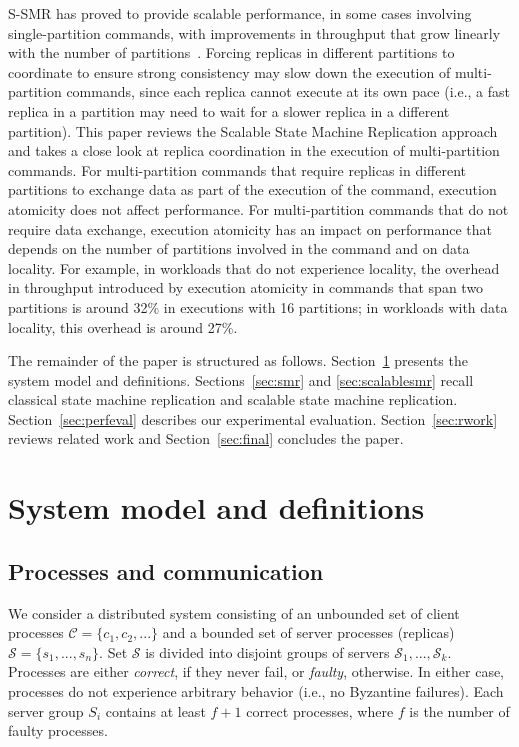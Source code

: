 \documentclass[11pt]{article}
\newcommand{\ccm}{\mathcal{C}}
\newcommand{\ssm}{\mathcal{S}}
\begin{document}
S-SMR has proved to provide scalable performance, in some cases involving single-partition commands, with improvements in throughput that grow linearly with the number of partitions~\cite{bezerra2014ssmr}.
Forcing replicas in different partitions to coordinate to ensure strong consistency may slow down the execution of multi-partition commands, since each replica cannot execute at its own pace (i.e., a fast replica in a partition may need to wait for a slower replica in a different partition).
This paper reviews the Scalable State Machine Replication approach and takes a close look at replica coordination in the execution of multi-partition commands.
For multi-partition commands that require replicas in different partitions to exchange data as part of the execution of the command, execution atomicity does not affect performance.
For multi-partition commands that do not require data exchange, execution atomicity has an impact on performance that depends on the number of partitions involved in the command and on data locality.
For example, in workloads that do not experience locality, the overhead in throughput introduced by execution atomicity in commands that span two partitions is around 32\% in executions with 16 partitions;
in workloads with data locality, this overhead is around 27\%.

The remainder of the paper is structured as follows.
Section~\ref{sec:sysmodel} presents the system model and definitions.
Sections~\ref{sec:smr} and \ref{sec:scalablesmr} recall classical state machine replication and scalable state machine replication.
Section~\ref{sec:perfeval} describes our experimental evaluation.
Section~\ref{sec:rwork} reviews related work and Section~\ref{sec:final} concludes the paper.

\section{System model and definitions}
\label{sec:sysmodel}

\subsection{Processes and communication}

We consider a distributed system consisting of an unbounded set of client processes $\ccm = \{c_1, c_2, ...\}$ and a bounded set of server processes (replicas) $\ssm = \{s_1, ..., s_n\}$.
Set $\ssm$ is divided into disjoint groups of servers $\ssm_1, ..., \ssm_k$.
Processes are either \emph{correct}, if they never fail, or \emph{faulty}, otherwise.
In either case, processes do not experience arbitrary behavior (i.e., no Byzantine failures).
Each server group $S_i$ contains at least $f + 1$ correct processes, where $f$ is the number of faulty processes.
\end{document}
